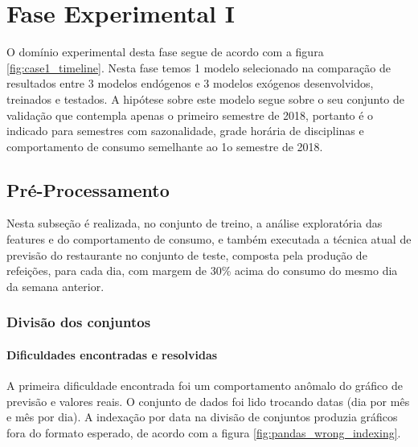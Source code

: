 \documentclass[	12pt, Times, openright, twoside, a4paper, english, brazil]{abntex2}
\begin{document}
	\section{Fase Experimental I}
	     \begin{figure}[htb]
        \end{figure}
	    O domínio experimental desta fase segue de acordo com a figura \ref{fig:case1_timeline}.
	    Nesta fase temos 1 modelo selecionado na comparação de resultados entre 3 modelos endógenos e 3 modelos exógenos desenvolvidos, treinados e testados.
	    A hipótese sobre este modelo segue sobre o seu conjunto de validação que contempla apenas o primeiro semestre de 2018, portanto é o indicado para semestres com sazonalidade, grade horária de disciplinas e comportamento de consumo semelhante ao 1o semestre de 2018.
	    
	    \subsection{Pré-Processamento}
	        Nesta subseção é realizada, no conjunto de treino, a análise exploratória das features e do comportamento de consumo, e também executada a técnica atual de previsão do restaurante no conjunto de teste, composta pela produção de refeições, para cada dia, com margem de 30\% acima do consumo do mesmo dia da semana anterior.
    	    \subsubsection{Divisão dos conjuntos}
    	        
    	        \paragraph{Dificuldades encontradas e resolvidas}
    	            A primeira dificuldade encontrada foi um comportamento anômalo do gráfico de previsão e valores reais. O conjunto de dados foi lido trocando datas (dia por mês e mês por dia). A indexação por data na divisão de conjuntos produzia gráficos fora do formato esperado, de acordo com a figura \ref{fig:pandas_wrong_indexing}.
    	            
\end{document}
